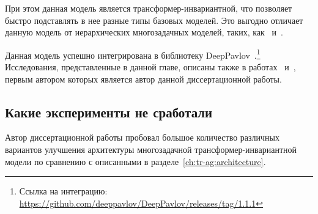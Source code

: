 При этом данная модель является трансформер-инвариантной, что позволяет быстро подставлять в нее разные типы базовых моделей. Это выгодно отличает данную модель от иерархических многозадачных моделей, таких, как~\cite{stickland_2019} и~\cite{TaskEmbedded2021}.

Данная модель успешно интегрирована в библиотеку DeepPavlov~\cite{dp_2023}.\footnote{Ссылка на интеграцию: \url{https://github.com/deeppavlov/DeepPavlov/releases/tag/1.1.1}} Исследования, представленные в данной главе, описаны также в работах~\cite{rumtl} и~\cite{enmtl}, первым автором которых является автор данной диссертационной работы.

\subsection{Какие эксперименты не сработали}\label{ch:tr-ag:failed_attempts} 
Автор диссертационной работы пробовал большое количество различных вариантов улучшения архитектуры многозадачной трансформер-инвариантной модели по сравнению с описанными в разделе~\ref{ch:tr-ag:architecture}.
